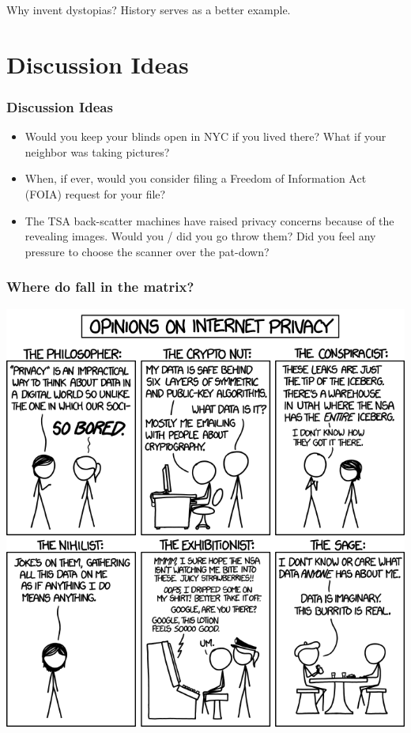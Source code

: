 \documentclass{beamer}
\begin{document}
\begin{frame}
\begin{columns}[c]
\begin{figure}
    \end{figure}

    \end{columns}

\begin{block}{Why invent dystopias?}
      History serves as a better example.
\end{block}


\end{frame}


\section{Discussion Ideas}

\begin{frame}
\frametitle{Discussion Ideas}

\begin{itemize}
\item Would you keep your blinds open in NYC if you lived there?  What
  if your neighbor was taking pictures?
\item When, if ever, would you consider filing a Freedom of
  Information Act (FOIA) request for your file?
\item The TSA back-scatter machines have raised privacy concerns
  because of the revealing images.  Would you / did you go throw them?
  Did you feel any pressure to choose the scanner over the pat-down?

\end{itemize}
\end{frame}


\begin{frame}
\frametitle{Where do fall in the matrix?}
\begin{center}
\includegraphics[width=\textwidth,height=.8\textheight,keepaspectratio]{img/privacy_opinions}
\end{center}
\end{frame}
\end{document}
